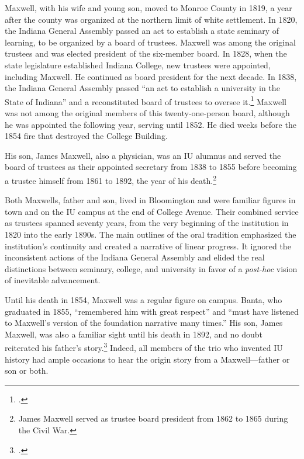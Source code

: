 \documentclass[
  american,
  letterpaper,
]{scrreprt}
\begin{document}
Maxwell, with his wife and young son, moved to Monroe County in 1819, a
year after the county was organized at the northern limit of white
settlement. In 1820, the Indiana General Assembly passed an act to
establish a state seminary of learning, to be organized by a board of
trustees. Maxwell was among the original trustees and was elected
president of the six-member board. In 1828, when the state legislature
established Indiana College, new trustees were appointed, including
Maxwell. He continued as board president for the next decade. In 1838,
the Indiana General Assembly passed ``an act to establish a university
in the State of Indiana'' and a reconstituted board of trustees to
oversee it.\footnote{.} Maxwell was
not among the original members of this twenty-one-person board, although
he was appointed the following year, serving until 1852. He died weeks
before the 1854 fire that destroyed the College Building.

His son, James Maxwell, also a physician, was an IU alumnus and served
the board of trustees as their appointed secretary from 1838 to 1855
before becoming a trustee himself from 1861 to 1892, the year of his
death.\footnote{James Maxwell served as trustee board president from
  1862 to 1865 during the Civil War.}

Both Maxwells, father and son, lived in Bloomington and were familiar
figures in town and on the IU campus at the end of College Avenue. Their
combined service as trustees spanned seventy years, from the very
beginning of the institution in 1820 into the early 1890s. The main
outlines of the oral tradition emphasized the institution's continuity
and created a narrative of linear progress. It ignored the inconsistent
actions of the Indiana General Assembly and elided the real distinctions
between seminary, college, and university in favor of a \emph{post-hoc}
vision of inevitable advancement.

Until his death in 1854, Maxwell was a regular figure on campus. Banta,
who graduated in 1855, ``remembered him with great respect'' and ``must
have listened to Maxwell's version of the foundation narrative many
times.'' His son, James Maxwell, was also a familiar sight until his
death in 1892, and no doubt reiterated his father's story.\footnote{.} Indeed, all members
of the trio who invented IU history had ample occasions to hear the
origin story from a Maxwell---father or son or both.
\end{document}
